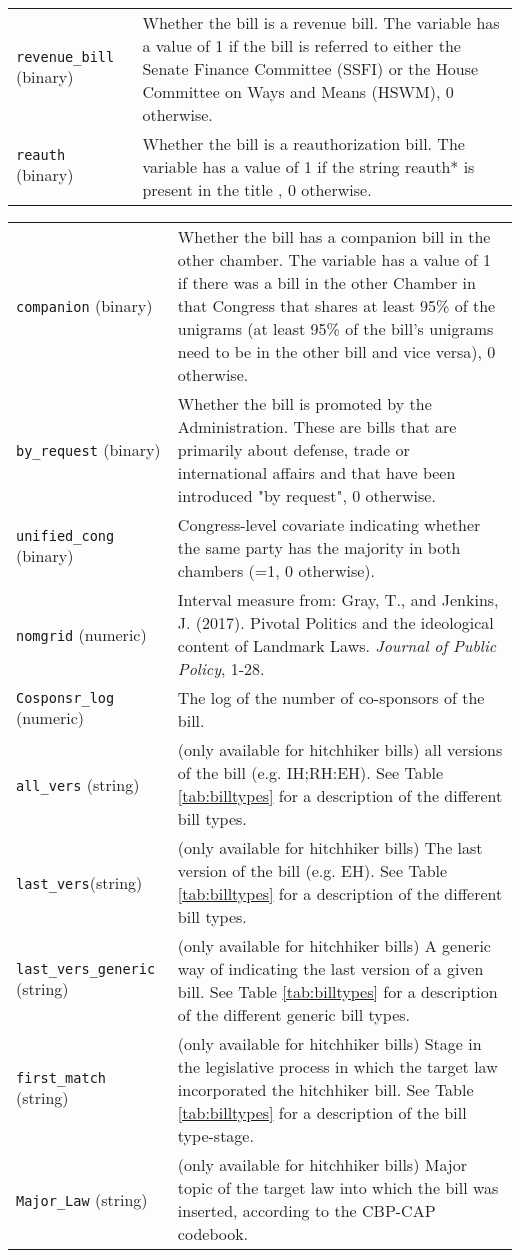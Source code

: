 \documentclass[10pt,a4paper]{article}
\begin{document}
\begin{table}[!h]
\begin{tabular}{lL{12cm}}
\texttt{revenue\_bill} (binary) & Whether the bill is a revenue bill. The variable has a value of 1 if the bill is referred to either the Senate Finance Committee (SSFI) or the House Committee on Ways and Means (HSWM), 0 otherwise. \\
\texttt{reauth} (binary) & Whether the bill is a reauthorization bill. The variable has a value of 1 if the string reauth* is present in the title , 0 otherwise. 
\end{tabular}
\end{table}



\hspace*{-1.25cm}\begin{tabular}{lL{11.5cm}}
\texttt{companion} (binary) & Whether the bill has a companion bill in the other chamber. The variable has a value of 1 if there was a bill in the other Chamber in that Congress that shares at least 95\% of the unigrams (at least 95\% of the bill's unigrams need to be in the other bill and vice versa), 0 otherwise.  \\
\texttt{by\_request} (binary) & Whether the bill is promoted by the Administration. These are bills that are primarily about defense, trade or international affairs and that have been introduced "by request", 0 otherwise. \\
\texttt{unified\_cong} (binary) & Congress-level covariate indicating whether the same party has the majority in both chambers (=1, 0 otherwise). \\
\texttt{nomgrid} (numeric) & Interval measure from: Gray, T., and Jenkins, J. (2017). Pivotal Politics and the ideological content of Landmark Laws. \textit{Journal of Public Policy}, 1-28. \\
\texttt{Cosponsr\_log} (numeric) & The log of the number of co-sponsors of the bill. \\
\texttt{all\_vers}	(string) & (only available for hitchhiker bills) all versions of the bill (e.g. IH;RH:EH).  See Table \ref{tab:billtypes} for a description of the different bill types. \\
\texttt{last\_vers}(string) &  (only available for hitchhiker bills) The last version of the bill (e.g. EH). See Table \ref{tab:billtypes} for a description of the different bill types. \\
\texttt{last\_vers\_generic}	(string) &  (only available for hitchhiker bills) A generic way of indicating the last version of a given bill. See Table \ref{tab:billtypes} for a description of the different generic bill types. \\
\texttt{first\_match}	(string) & (only available for hitchhiker bills) Stage in the legislative process in which the target law incorporated the hitchhiker bill.  See Table \ref{tab:billtypes} for a description of the bill type-stage. \\
\texttt{Major\_Law}	(string) & (only available for hitchhiker bills) Major topic of the target law into which the bill was inserted, according to the CBP-CAP codebook. \\
\end{tabular}
\end{document}
